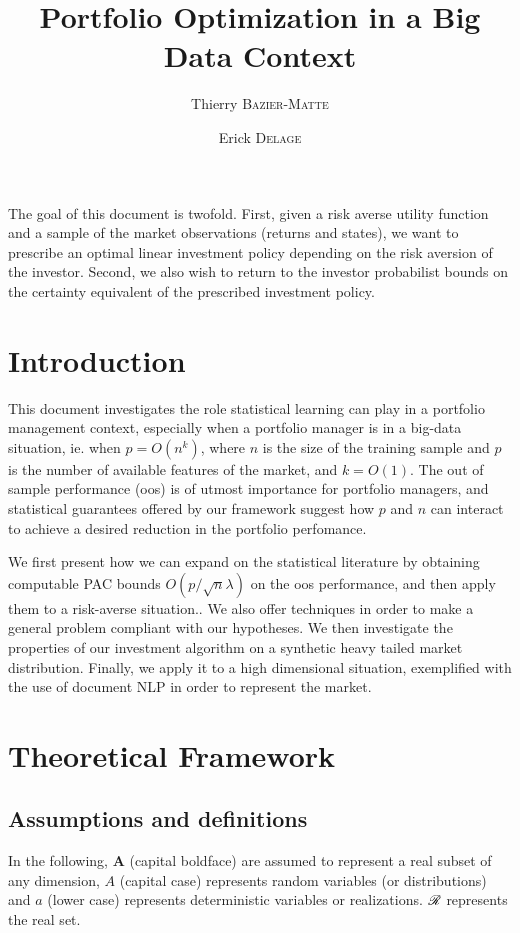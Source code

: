 \documentclass[11pt]{article}
\title{Portfolio Optimization in a Big Data Context}
\author{Thierry \textsc{Bazier-Matte} \and Erick \textsc{Delage}}
\begin{document}
\maketitle


The goal of this document is twofold. First, given a risk averse utility function and a
sample of the market observations (returns and states), we want to prescribe an optimal
linear investment policy depending on the risk aversion of the investor. Second, we also
wish to return to the investor probabilist bounds on the certainty equivalent of the
prescribed investment policy.

\section{Introduction}
\label{sec:intro}

This document investigates the role statistical learning can play in a portfolio
management context, especially when a portfolio manager is in a big-data situation,
ie. when $p=O(n^k)$, where $n$ is the size of the training sample and $p$ is the number of
available features of the market, and $k=O(1)$. The out of sample performance (oos) is of
utmost importance for portfolio managers, and statistical guarantees offered by our
framework suggest how $p$ and $n$ can interact to achieve a desired reduction in the
portfolio perfomance.

We first present how we can expand on the statistical literature by obtaining computable
PAC bounds $O(p/\sqrt{n}\lambda)$ on the oos performance, and then apply them to a
risk-averse situation.. We also offer techniques in order to make a general problem
compliant with our hypotheses. We then investigate the properties of our investment
algorithm on a synthetic heavy tailed market distribution. Finally, we apply it to a high
dimensional situation, exemplified with the use of document NLP in order to represent the
market.

\section{Theoretical Framework}

\subsection{Assumptions and definitions}


In the following, $\bm A$ (capital boldface) are assumed to represent a real subset of any
dimension, $A$ (capital case) represents random variables (or distributions) and $a$
(lower case) represents deterministic variables or realizations. $\mathscr{R}$ represents the
real set.
\end{document}

